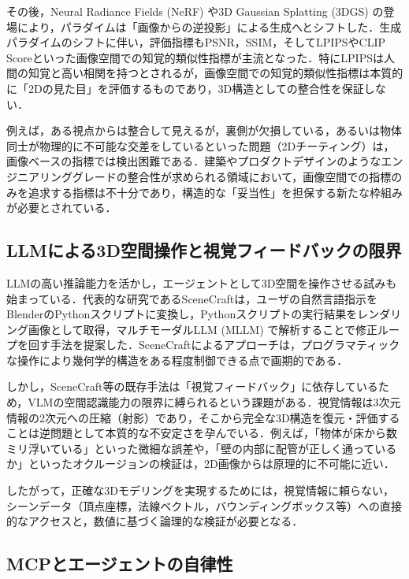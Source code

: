 \documentclass[dvipdfmx, a4paper, 9pt]{deimj}
\begin{document}
その後，Neural Radiance Fields (NeRF)\cite{mildenhall2020nerf} や3D Gaussian Splatting (3DGS)\cite{kerbl20233dgs} の登場により，パラダイムは「画像からの逆投影」による生成へとシフトした．生成パラダイムのシフトに伴い，評価指標もPSNR，SSIM，そしてLPIPS\cite{zhang2018lpips}やCLIP Score\cite{radford2021clip}といった画像空間での知覚的類似性指標が主流となった．特にLPIPSは人間の知覚と高い相関を持つとされるが，画像空間での知覚的類似性指標は本質的に「2Dの見た目」を評価するものであり，3D構造としての整合性を保証しない．

例えば，ある視点からは整合して見えるが，裏側が欠損している，あるいは物体同士が物理的に不可能な交差をしているといった問題（2Dチーティング）は，画像ベースの指標では検出困難である\cite{poole2022dreamfusion}．建築やプロダクトデザインのようなエンジニアリンググレードの整合性が求められる領域において，画像空間での指標のみを追求する指標は不十分であり，構造的な「妥当性」を担保する新たな枠組みが必要とされている．

\subsection{LLMによる3D空間操作と視覚フィードバックの限界}

LLMの高い推論能力を活かし，エージェントとして3D空間を操作させる試みも始まっている．代表的な研究であるSceneCraft\cite{hu2024scenecraft}は，ユーザの自然言語指示をBlenderのPythonスクリプトに変換し，Pythonスクリプトの実行結果をレンダリング画像として取得，マルチモーダルLLM (MLLM) で解析することで修正ループを回す手法を提案した．SceneCraftによるアプローチは，プログラマティックな操作により幾何学的構造をある程度制御できる点で画期的である．

しかし，SceneCraft等の既存手法は「視覚フィードバック」に依存しているため，VLMの空間認識能力の限界に縛られるという課題がある．視覚情報は3次元情報の2次元への圧縮（射影）であり，そこから完全な3D構造を復元・評価することは逆問題として本質的な不安定さを孕んでいる．例えば，「物体が床から数ミリ浮いている」といった微細な誤差や，「壁の内部に配管が正しく通っているか」といったオクルージョンの検証は，2D画像からは原理的に不可能に近い．

したがって，正確な3Dモデリングを実現するためには，視覚情報に頼らない，シーンデータ（頂点座標，法線ベクトル，バウンディングボックス等）への直接的なアクセスと，数値に基づく論理的な検証が必要となる．

\subsection{MCPとエージェントの自律性}
\end{document}
